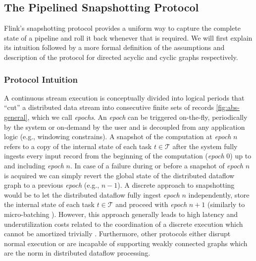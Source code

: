 \subsection{The Pipelined Snapshotting Protocol}

Flink's snapshotting protocol provides a uniform way to capture the complete state of a pipeline and roll it back whenever that is required. We will first explain its intuition followed by a more formal definition of the assumptions and description of the protocol for directed acyclic and cyclic graphs respectively.

\subsubsection{Protocol Intuition}

A continuous stream execution is conceptually divided into logical periods that ``cut'' a distributed data stream into consecutive finite sets of records \ref{fig:abs-general}, which we call \emph{epochs}. An \emph{epoch} can be triggered on-the-fly, periodically by the system or on-demand by the user and is decoupled from any application logic (e.g., windowing constrains). A snapshot of the computation at \emph{epoch} $n$ refers to a copy of the internal state of each task $t \in \mathcal{T}$ after the system fully ingests every input record from the beginning of the computation (\emph{epoch} 0) up to and including \emph{epoch} $n$. In case of a failure during or before a snapshot of \emph{epoch} $n$ is acquired we can simply revert the global state of the distributed dataflow graph to a previous \emph{epoch} (e.g., $n-1$). A discrete approach to snapshotting would be to let the distributed dataflow fully ingest \emph{epoch} $n$ independently, store the internal state of each task $t \in \mathcal{T}$ and proceed with \emph{epoch} $n+1$ (similarly to micro-batching \cite{zaharia2012discretized}). However, this approach generally leads to high latency and underutilization costs related to the coordination of a discrete execution which cannot be amortized trivially \cite{venkataramandrizzle}. Furthermore, other protocols either disrupt normal execution \cite{murray2013naiad,jacques2016consistent} or are incapable of supporting weakly connected graphs \cite{chandy1985distributed} which are the norm in distributed dataflow processing.

